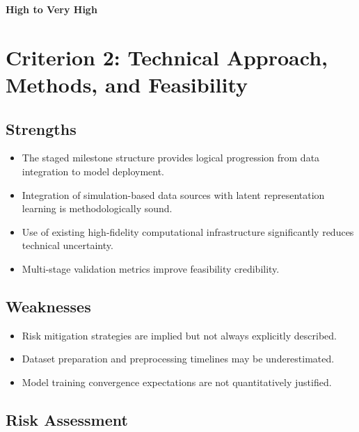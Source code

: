 \documentclass[11pt]{article}
\begin{document}
\textbf{High to Very High}

\section*{Criterion 2: Technical Approach, Methods, and Feasibility}

\subsection*{Strengths}

\begin{itemize}[leftmargin=1.5em]

\item The staged milestone structure provides logical progression from data integration to model deployment.

\item Integration of simulation-based data sources with latent representation learning is methodologically sound.

\item Use of existing high-fidelity computational infrastructure significantly reduces technical uncertainty.

\item Multi-stage validation metrics improve feasibility credibility.

\end{itemize}

\subsection*{Weaknesses}

\begin{itemize}[leftmargin=1.5em]

\item Risk mitigation strategies are implied but not always explicitly described.

\item Dataset preparation and preprocessing timelines may be underestimated.

\item Model training convergence expectations are not quantitatively justified.

\end{itemize}

\subsection*{Risk Assessment}
\end{document}
